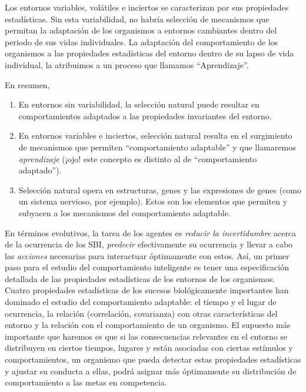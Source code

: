 \documentclass[
  a4paper,
  DIV=11,
  numbers=noendperiod]{scrreprt}
\begin{document}
Los entornos variables, volátiles e inciertos se caracterizan por sus
propiedades estadísticas. Sin esta variabilidad, no habría selección de
mecanismos que permitan la adaptación de los organismos a entornos
cambiantes dentro del periodo de sus vidas individuales. La adaptación
del comportamiento de los organismos a las propiedades estadísticas del
entorno dentro de su lapso de vida individual, la atribuimos a un
proceso que llamamos ``Aprendizaje''.

En resumen,

\begin{enumerate}
\def\labelenumi{\arabic{enumi}.}
\item
  En entornos sin variabilidad, la selección natural puede resultar en
  comportamientos adaptados a las propiedades invariantes del entorno.
\item
  En entornos variables e inciertos, selección natural resulta en el
  surgimiento de mecanismos que permiten ``comportamiento adaptable'' y
  que llamaremos \emph{aprendizaje} (¡ojo! este concepto es distinto al
  de ``comportamiento adaptado'').
\item
  Selección natural opera en estructuras, genes y las expresiones de
  genes (como un sistema nervioso, por ejemplo). Estos son los elementos
  que permiten y subyacen a los mecanismos del comportamiento adaptable.
\end{enumerate}

En términos evolutivos, la tarea de los agentes es \emph{reducir la
incertidumbre} acerca de la ocurrencia de los SBI, \emph{predecir}
efectivamente su ocurrencia y llevar a cabo las \emph{acciones}
necesarias para interactuar óptimamente con estos. Así, un primer paso
para el estudio del comportamiento inteligente es tener una
especificación detallada de las propiedades estadísticas de los entornos
de los organismos. Cuatro propiedades estadísticas de los sucesos
biológicamente importantes han dominado el estudio del comportamiento
adaptable: el tiempo y el lugar de ocurrencia, la relación (correlación,
covarianza) con otras características del entorno y la relación con el
comportamiento de un organismo. El supuesto más importante que haremos
es que si las consecuencias relevantes en el entorno se distribuyen en
ciertos tiempos, lugares y están asociadas con ciertas estímulos y
comportamientos, un organismo que pueda detectar estas propiedades
estadísticas y ajustar su conducta a ellas, podrá asignar más
óptimamente su distribución de comportamiento a las metas en
competencia.
\end{document}
